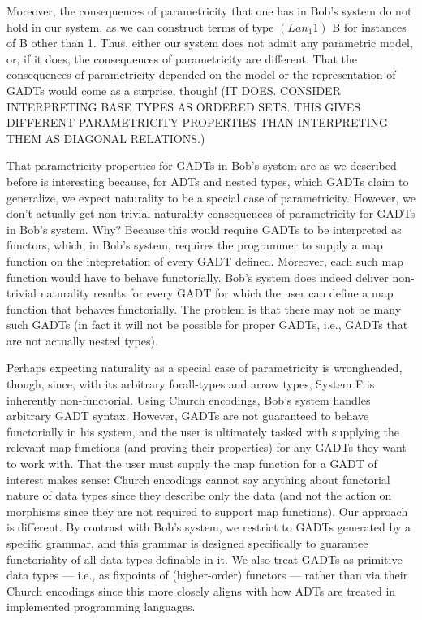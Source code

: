 \documentclass[acmsmall,screen,review,anonymous]{acmart}
\theoremstyle{definition}
\begin{document}
Moreover, the consequences of parametricity that one has in Bob's
system do not hold in our system, as we can construct terms of type
$(Lan_1 1)$ B for instances of B other than 1.  Thus, either our
system does not admit any parametric model, or, if it does, the
consequences of parametricity are different.  That the consequences of
parametricity depended on the model or the representation of GADTs
would come as a surprise, though!  (IT DOES. CONSIDER INTERPRETING
BASE TYPES AS ORDERED SETS. THIS GIVES DIFFERENT PARAMETRICITY
PROPERTIES THAN INTERPRETING THEM AS DIAGONAL RELATIONS.)

That parametricity properties for GADTs in Bob's system are as we
described before is interesting because, for ADTs and nested types,
which GADTs claim to generalize, we expect naturality to be a special
case of parametricity. However, we don't actually get non-trivial
naturality consequences of parametricity for GADTs in Bob's
system. Why? Because this would require GADTs to be interpreted as
functors, which, in Bob's system, requires the programmer to supply a
map function on the intepretation of every GADT defined. Moreover,
each such map function would have to behave functorially. Bob's system
does indeed deliver non-trivial naturality results for every GADT for
which the user can define a map function that behaves
functorially. The problem is that there may not be many such GADTs (in
fact it will not be possible for proper GADTs, i.e., GADTs that are
not actually nested types).








Perhaps expecting naturality as a special case of parametricity is
wrongheaded, though, since, with its arbitrary forall-types and arrow
types, System F is inherently non-functorial. Using Church encodings,
Bob's system handles arbitrary GADT syntax. However, GADTs are not
guaranteed to behave functorially in his system, and the user is
ultimately tasked with supplying the relevant map functions (and
proving their properties) for any GADTs they want to work with. That
the user must supply the map function for a GADT of interest makes
sense: Church encodings cannot say anything about functorial nature of
data types since they describe only the data (and not the action on
morphisms since they are not required to support map functions).  Our
approach is different. By contrast with Bob's system, we restrict to
GADTs generated by a specific grammar, and this grammar is designed
specifically to guarantee functoriality of all data types definable in
it. We also treat GADTs as primitive data types --- i.e., as fixpoints
of (higher-order) functors --- rather than via their Church encodings
since this more closely aligns with how ADTs are treated in
implemented programming languages.
\end{document}
